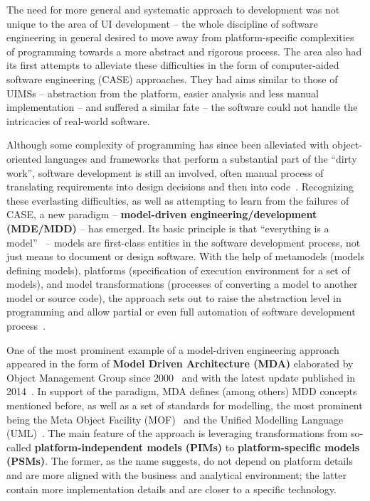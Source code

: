 The need for more general and systematic approach to development was not unique to the area of UI development -- the whole discipline of software engineering in general desired to move away from platform-specific complexities of programming towards a more abstract and rigorous process.
The area also had its first attempts to alleviate these difficulties in the form of computer-aided software engineering (CASE) approaches.
They had aims similar to those of UIMSs -- abstraction from the platform, easier analysis and less manual implementation -- and suffered a similar fate -- the software could not handle the intricacies of real-world software.

Although some complexity of programming has since been alleviated with object-oriented languages and frameworks that perform a substantial part of the \enquote{dirty work}, software development is still an involved, often manual process of translating requirements into design decisions and then into code~\cite{Schmidt2006}.
Recognizing these everlasting difficulties, as well as attempting to learn from the failures of CASE, a new paradigm -- \textbf{model-driven engineering/development (MDE/MDD)} -- has emerged.
Its basic principle is that \enquote{everything is a model}~\cite{bezivin2004search} -- models are first-class entities in the software development process, not just means to document or design software.
With the help of metamodels (models defining models), platforms (specification of execution environment for a set of models), and model transformations (processes of converting a model to another model or source code), the approach sets out to raise the abstraction level in programming and allow partial or even full automation of software development process~\cite{mellor2004mda}.

One of the most prominent example of a model-driven engineering approach appeared in the form of \textbf{Model Driven Architecture (MDA)} elaborated by Object Management Group since 2000~\cite{richard_soley_model_2000} and with the latest update published in 2014~\cite{mda_2014}.
In support of the paradigm, MDA defines (among others) MDD concepts mentioned before, as well as a set of standards for modelling, the most prominent being the Meta Object Facility (MOF)~ and the Unified Modelling Language (UML)~.
The main feature of the approach is leveraging transformations from so-called \textbf{platform-independent models (PIMs)} to \textbf{platform-specific models (PSMs)}.
The former, as the name suggests, do not depend on platform details and are more aligned with the business and analytical environment;
the latter contain more implementation details and are closer to a specific technology.


